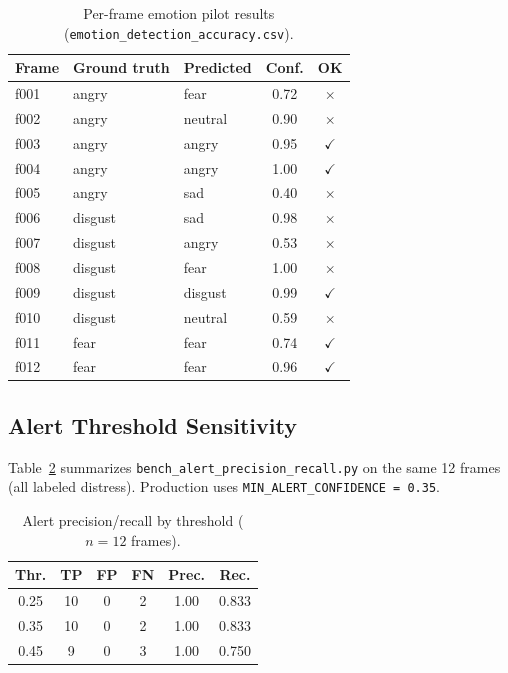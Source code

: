 \documentclass[conference]{IEEEtran}
\begin{document}
\begin{table}[!t]
\centering
\caption{Per-frame emotion pilot results (\texttt{emotion\_detection\_accuracy.csv}).}
\label{tab:emotion}
\scriptsize
\begin{tabular}{@{}lllcc@{}}
\toprule
\textbf{Frame} & \textbf{Ground truth} & \textbf{Predicted} & \textbf{Conf.} & \textbf{OK} \\
\midrule
f001 & angry & fear & 0.72 & $\times$ \\
f002 & angry & neutral & 0.90 & $\times$ \\
f003 & angry & angry & 0.95 & $\checkmark$ \\
f004 & angry & angry & 1.00 & $\checkmark$ \\
f005 & angry & sad & 0.40 & $\times$ \\
f006 & disgust & sad & 0.98 & $\times$ \\
f007 & disgust & angry & 0.53 & $\times$ \\
f008 & disgust & fear & 1.00 & $\times$ \\
f009 & disgust & disgust & 0.99 & $\checkmark$ \\
f010 & disgust & neutral & 0.59 & $\times$ \\
f011 & fear & fear & 0.74 & $\checkmark$ \\
f012 & fear & fear & 0.96 & $\checkmark$ \\
\bottomrule
\end{tabular}
\end{table}

\subsection{Alert Threshold Sensitivity}
Table~\ref{tab:alert} summarizes \texttt{bench\_alert\_precision\_recall.py} on the same 12 frames (all labeled distress). Production uses \texttt{MIN\_ALERT\_CONFIDENCE = 0.35}.

\begin{table}[!t]
\centering
\caption{Alert precision/recall by threshold ($n{=}12$ frames).}
\label{tab:alert}
\small
\begin{tabular}{@{}cccccc@{}}
\toprule
\textbf{Thr.} & \textbf{TP} & \textbf{FP} & \textbf{FN} & \textbf{Prec.} & \textbf{Rec.} \\
\midrule
0.25 & 10 & 0 & 2 & 1.00 & 0.833 \\
0.35 & 10 & 0 & 2 & 1.00 & 0.833 \\
0.45 & 9 & 0 & 3 & 1.00 & 0.750 \\
\bottomrule
\end{tabular}
\end{table}
\end{document}
